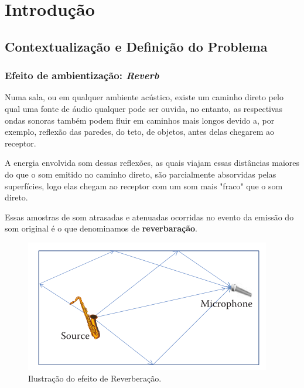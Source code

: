 \chapter{Introdução}



\section{Contextualização e Definição do Problema}
	\subsection{Efeito  de ambientização: \textit{Reverb}}
	\label{aplicabilidade}
		
		Numa sala, ou em qualquer ambiente acústico, existe um caminho direto pelo qual uma fonte de áudio qualquer pode ser ouvida, no entanto, as respectivas ondas sonoras também podem fluir em caminhos mais longos devido a, por exemplo, reflexão das paredes, do teto, de objetos, antes delas chegarem ao receptor.
		
		A energia envolvida som dessas reflexões, as quais viajam essas distâncias maiores do que o som emitido no caminho direto, são parcialmente absorvidas pelas superfícies, logo elas chegam ao receptor com um som mais "fraco" que o som direto.
		
		Essas amostras de som atrasadas e atenuadas ocorridas no evento da emissão do som original é o que denominamos de \textbf{reverbaração}.
		
		\begin{figure}[!ht]
			\centering
			\includegraphics[scale=0.5]{./figuras/reverb01.png}
			\caption{Ilustração do efeito de Reverberação.}
			\label{reverb01}
		\end{figure}
		
